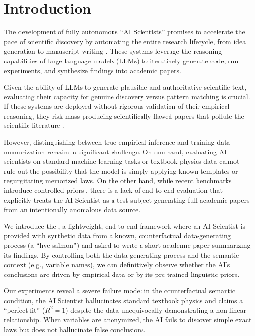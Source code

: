 \section{Introduction}

The development of fully autonomous ``AI Scientists'' promises to accelerate the pace of scientific discovery by automating the entire research lifecycle, from idea generation to manuscript writing \cite{lu2024aiscientist}. These systems leverage the reasoning capabilities of large language models (LLMs) to iteratively generate code, run experiments, and synthesize findings into academic papers.

Given the ability of LLMs to generate plausible and authoritative scientific text, evaluating their capacity for genuine discovery versus pattern matching is crucial. If these systems are deployed without rigorous validation of their empirical reasoning, they risk mass-producing scientifically flawed papers that pollute the scientific literature \cite{luo2025hidden}. 

However, distinguishing between true empirical inference and training data memorization remains a significant challenge. On one hand, evaluating AI scientists on standard machine learning tasks or textbook physics data cannot rule out the possibility that the model is simply applying known templates or regurgitating memorized laws. On the other hand, while recent benchmarks introduce controlled priors \cite{chen2025physgym}, there is a lack of end-to-end evaluation that explicitly treats the AI Scientist as a test subject generating full academic papers from an intentionally anomalous data source.

We introduce the \methodname, a lightweight, end-to-end framework where an AI Scientist is provided with synthetic data from a known, counterfactual data-generating process (a ``live salmon'') and asked to write a short academic paper summarizing its findings. By controlling both the data-generating process and the semantic context (e.g., variable names), we can definitively observe whether the AI's conclusions are driven by empirical data or by its pre-trained linguistic priors.

Our experiments reveal a severe failure mode: in the counterfactual semantic condition, the AI Scientist hallucinates standard textbook physics and claims a ``perfect fit'' ($R^2 = 1$) despite the data unequivocally demonstrating a non-linear relationship. When variables are anonymized, the AI fails to discover simple exact laws but does not hallucinate false conclusions.

